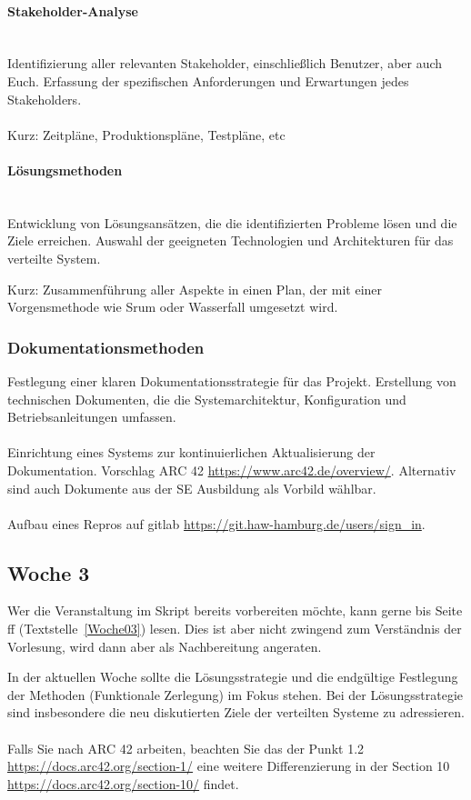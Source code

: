 \paragraph{Stakeholder-Analyse}
\mbox{}\\
Identifizierung aller relevanten Stakeholder, einschließlich Benutzer, aber auch Euch. Erfassung der spezifischen Anforderungen und Erwartungen jedes Stakeholders.
\\\\	
Kurz: Zeitpläne, Produktionspläne, Testpläne, etc

\paragraph{Lösungsmethoden}
\mbox{}\\
Entwicklung von Lösungsansätzen, die die identifizierten Probleme lösen und die Ziele erreichen.
Auswahl der geeigneten Technologien und Architekturen für das verteilte System.
	
Kurz: Zusammenführung aller Aspekte in einen Plan, der mit einer Vorgensmethode wie Srum oder Wasserfall umgesetzt wird. 

\subsubsection{Dokumentationsmethoden}

Festlegung einer klaren Dokumentationsstrategie für das Projekt.	
Erstellung von technischen Dokumenten, die die Systemarchitektur, Konfiguration und Betriebsanleitungen umfassen.
\\\\	
Einrichtung eines Systems zur kontinuierlichen Aktualisierung der Dokumentation. Vorschlag ARC 42 \url{https://www.arc42.de/overview/}. Alternativ sind auch Dokumente aus der SE Ausbildung als Vorbild wählbar.
\\\\ 
Aufbau eines Repros auf gitlab \url{https://git.haw-hamburg.de/users/sign_in}.
\subsection{Woche 3}
Wer die Veranstaltung im Skript bereits vorbereiten möchte, kann gerne bis Seite \pageref{Woche03}ff (Textstelle~\ref{Woche03}) lesen. Dies ist aber nicht zwingend zum Verständnis der Vorlesung, wird dann aber als Nachbereitung angeraten.

In der aktuellen Woche sollte die Lösungsstrategie und die endgültige Festlegung der Methoden (Funktionale Zerlegung) im Fokus stehen.  Bei der Lösungsstrategie sind insbesondere die neu diskutierten Ziele der verteilten Systeme zu adressieren. 
\\\\
Falls Sie nach ARC 42 arbeiten, beachten Sie das der Punkt 1.2 \url{https://docs.arc42.org/section-1/} eine weitere Differenzierung in der Section 10 \url{https://docs.arc42.org/section-10/} findet.
